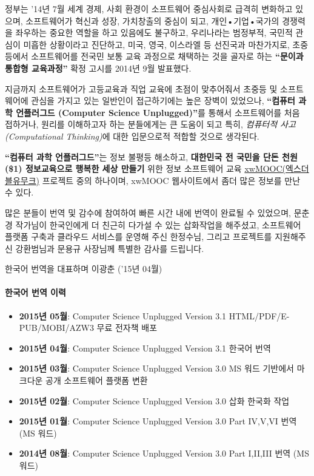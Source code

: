 \documentclass[]{article}
\begin{document}
정부는 '14년 7월 세계 경제, 사회 환경이 소프트웨어 중심사회로 급격히
변화하고 있으며, 소프트웨어가 혁신과 성장, 가치창출의 중심이 되고,
개인•기업•국가의 경쟁력을 좌우하는 중요한 역할을 하고 있음에도 불구하고,
우리나라는 범정부적, 국민적 관심이 미흡한 상황이라고 진단하고, 미국,
영국, 이스라엘 등 선진국과 마찬가지로, 초중등에서 소프트웨어를 전국민
보통 교육 과정으로 채택하는 것을 골자로 하는 \textbf{``문이과 통합형
교육과정''} 확정 고시를 2014년 9월 발표했다.

지금까지 소프트웨어가 고등교육과 직업 교육에 초점이 맞추어줘서 초중등 및
소프트웨어에 관심을 가지고 있는 일반인이 접근하기에는 높은 장벽이
있었으나, \textbf{``컴퓨터 과학 언플러그드 (Computer Science
Unplugged)''}를 통해서 소프트웨어를 처음 접하거나, 원리를 이해하고자
하는 분들에게는 큰 도움이 되고 특히, \emph{컴퓨터적 사고(Computational
Thinking)}에 대한 입문으로적 적합할 것으로 생각된다.

\textbf{``컴퓨터 과학 언플러그드''}는 정보 불평등 해소하고,
\textbf{대한민국 전 국민을 단돈 천원(\$1) 정보교육으로 행복한 세상
만들기} 위한 정보 소프트웨어 교육
\href{http://www.xwmooc.net/}{xwMOOC(엑스더블유무크)} 프로젝트 중의
하나이며, xwMOOC 웹사이트에서 좀더 많은 정보를 만난 수 있다.

많은 분들이 번역 및 감수에 참여하여 빠른 시간 내에 번역이 완료될 수
있었으며, 문춘경 작가님이 한국인에게 더 친근히 다가설 수 있는 삽화작업을
해주셨고, 소프트웨어 플랫폼 구축과 클라우드 서비스를 운영해 주신
한정수님, 그리고 프로젝트를 지원해주신 강환범님과 문용규 사장님께 특별한
감사를 드립니다.

한국어 번역을 대표하며 이광춘 ('15년 04월)

\mbox{}\paragraph{한국어 번역 이력}\label{section}

\begin{itemize}
\itemsep1pt\parskip0pt
\item
  \textbf{2015년 05월}: Computer Science Unplugged Version 3.1
  HTML/PDF/E-PUB/MOBI/AZW3 무료 전자책 배포
\item
  \textbf{2015년 04월}: Computer Science Unplugged Version 3.1 한국어
  번역
\item
  \textbf{2015년 03월}: Computer Science Unplugged Version 3.0 MS 워드
  기반에서 마크다운 공개 소프트웨어 플랫폼 변환
\item
  \textbf{2015년 02월}: Computer Science Unplugged Version 3.0 삽화
  한국화 작업
\item
  \textbf{2015년 01월}: Computer Science Unplugged Version 3.0 Part
  IV,V,VI 번역 (MS 워드)
\item
  \textbf{2014년 08월}: Computer Science Unplugged Version 3.0 Part
  I,II,III 번역 (MS 워드)
\end{itemize}
\end{document}
